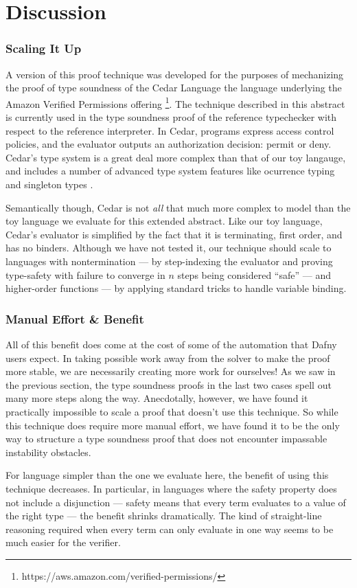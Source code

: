 \documentclass[sigplan,review,screen,anonymous]{acmart}
\begin{document}
\section{Discussion}
\label{sec:discussion}

\subsubsection*{Scaling It Up}
A version of this proof technique was developed for the purposes of mechanizing the proof of type soundness
of the Cedar Language \cite{cedar}
the language underlying the Amazon Verified Permissions offering \footnote{https://aws.amazon.com/verified-permissions/}.
The technique described in this abstract is currently used in the type soundness proof of the reference typechecker with respect to the reference interpreter.
In Cedar, programs express access control policies, and the evaluator outputs an authorization decision: permit or deny.
Cedar's type system is a great deal more complex than that of our toy langauge, and includes a number of advanced type system features like ocurrence typing \cite{typed-scheme} and
singleton types \cite{sing-types}.

Semantically though, Cedar is not \emph{all} that much more complex to model than the
toy language we evaluate for this extended abstract. Like our toy language,
Cedar's evaluator is simplified by the fact that it is terminating, first order, and has no binders.  Although we have not tested it, our
technique should scale to languages with nontermination --- by step-indexing the
evaluator and proving type-safety with failure to converge in $n$ steps being
considered ``safe'' \cite{step-indexing} --- and higher-order functions ---
by applying standard tricks to handle variable binding.


\subsubsection*{Manual Effort \& Benefit}
All of this benefit does come at the cost of some of the automation that Dafny
users expect. In taking possible work away from the solver to make the proof
more stable, we are necessarily creating more work for ourselves!  As we saw in
the previous section, the type soundness proofs in the last two cases spell out
many more steps along the way. Anecdotally, however, we have found it practically impossible
to scale a proof that doesn't use this technique. So while this technique does require more manual effort,
we have found it to be the only way to structure a type soundness proof that does not encounter impassable instability obstacles.

For language simpler than the one we evaluate here, the benefit of using this technique decreases. In particular, in languages
where the safety property does not include a disjunction --- safety means that every term evaluates to a value of the right type ---
the benefit shrinks dramatically. The kind of straight-line reasoning required when every term can only evaluate in one way seems to be
much easier for the verifier.






\end{document}

